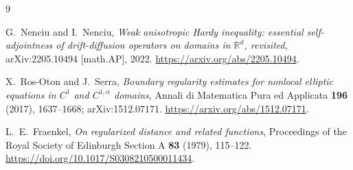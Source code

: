 \documentclass[11pt]{article}
\newcommand{\R}{\mathbb R}
\begin{document}
\begin{thebibliography}{9}

G.~Nenciu and I.~Nenciu,
\emph{Weak anisotropic Hardy inequality: essential self-adjointness of
drift-diffusion operators on domains in \(\R^d\), revisited},
arXiv:2205.10494 [math.AP], 2022.
\url{https://arxiv.org/abs/2205.10494}.

X.~Ros-Oton and J.~Serra,
\emph{Boundary regularity estimates for nonlocal elliptic equations in
\(C^1\) and \(C^{1,\alpha}\) domains},
Annali di Matematica Pura ed Applicata \textbf{196} (2017), 1637--1668;
arXiv:1512.07171.
\url{https://arxiv.org/abs/1512.07171}.

L.~E.~Fraenkel,
\emph{On regularized distance and related functions},
Proceedings of the Royal Society of Edinburgh Section A
\textbf{83} (1979), 115--122.
\url{https://doi.org/10.1017/S0308210500011434}.

\end{thebibliography}
\end{document}

